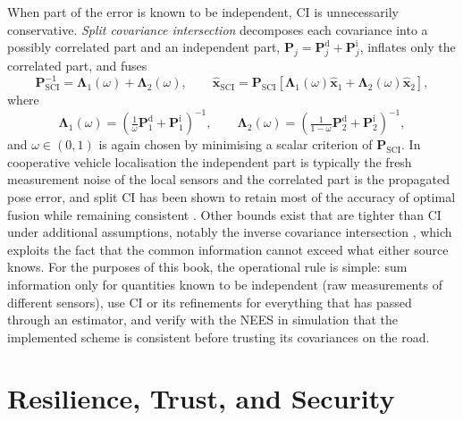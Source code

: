 \documentclass[graybox,envcountchap]{style/SNmono}
\begin{document}
When part of the error is known to be independent, CI is unnecessarily conservative. \emph{Split covariance intersection} \cite{julier2001_split_ci} decomposes each covariance into a possibly correlated part and an independent part, $\mathbf{P}_j=\mathbf{P}_j^{\mathrm{d}}+\mathbf{P}_j^{\mathrm{i}}$, inflates only the correlated part, and fuses
\begin{equation}
\mathbf{P}_{\mathrm{SCI}}^{-1}=\mathbf{\Lambda}_1(\omega)+\mathbf{\Lambda}_2(\omega),\qquad
\widehat{\mathbf{x}}_{\mathrm{SCI}}=\mathbf{P}_{\mathrm{SCI}}\left[\mathbf{\Lambda}_1(\omega)\widehat{\mathbf{x}}_1+\mathbf{\Lambda}_2(\omega)\widehat{\mathbf{x}}_2\right],
\label{eq:split-ci}
\end{equation}
where
\begin{equation}
\mathbf{\Lambda}_1(\omega)=\left(\tfrac{1}{\omega}\mathbf{P}_1^{\mathrm{d}}+\mathbf{P}_1^{\mathrm{i}}\right)^{-1},\qquad
\mathbf{\Lambda}_2(\omega)=\left(\tfrac{1}{1-\omega}\mathbf{P}_2^{\mathrm{d}}+\mathbf{P}_2^{\mathrm{i}}\right)^{-1},
\label{eq:split-ci-terms}
\end{equation}
and $\omega\in(0,1)$ is again chosen by minimising a scalar criterion of $\mathbf{P}_{\mathrm{SCI}}$.
In cooperative vehicle localisation the independent part is typically the fresh measurement noise of the local sensors and the correlated part is the propagated pose error, and split CI has been shown to retain most of the accuracy of optimal fusion while remaining consistent \cite{li2013_split_ci_vehicles}. Other bounds exist that are tighter than CI under additional assumptions, notably the inverse covariance intersection \cite{noack2017_ici}, which exploits the fact that the common information cannot exceed what either source knows. For the purposes of this book, the operational rule is simple: sum information only for quantities known to be independent (raw measurements of different sensors), use CI or its refinements for everything that has passed through an estimator, and verify with the NEES in simulation that the implemented scheme is consistent before trusting its covariances on the road.


\section{Resilience, Trust, and Security}
\label{sec:mas-resilience}
\end{document}
